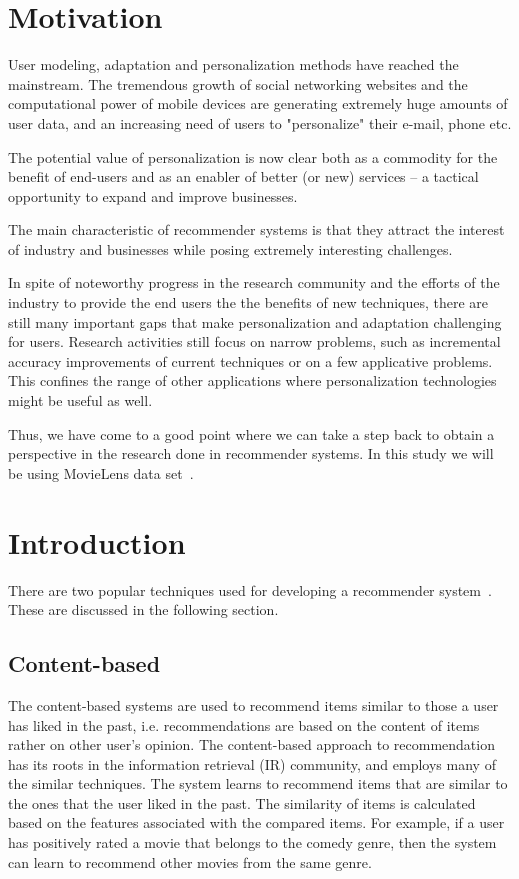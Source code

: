 \section{Motivation}

 User modeling, adaptation and personalization methods have reached the mainstream. The tremendous growth of social networking websites and the computational power of mobile devices are generating extremely huge amounts of user data, and an increasing need of users to "personalize" their e-mail, phone etc.

 The potential value of personalization is now clear both as a commodity for the benefit of end-users and as an enabler of better (or new) services – a tactical opportunity to expand and improve businesses.

 The main characteristic of recommender systems is that they attract the interest of industry and businesses while posing extremely interesting challenges.

 In spite of noteworthy progress in the research community and the efforts of the industry to provide the end users the the benefits of new techniques, there are still many important gaps that make personalization and adaptation challenging for users. Research activities still focus on narrow problems, such as incremental accuracy improvements of current techniques or on a few applicative problems. This confines the range of other applications where personalization technologies might be useful as well.

 Thus, we have come to a good point where we can take a step back to obtain a perspective in the research done in recommender systems. In this study we will be using MovieLens data set~\cite{movielens}.

\section{Introduction}
\label{sec:approaches}
There are two popular techniques used for developing a recommender system~\cite{nbrsurvey}. These are discussed in the following section.
\subsection{Content-based}
 The content-based systems are used to recommend items similar to those a user has liked in the past, i.e. recommendations are based on the content of items rather on other user's opinion. The content-based approach to recommendation has its roots in the information retrieval (IR) community, and employs many of the similar techniques. The system learns to recommend items that are similar to the ones that the user liked in the past. The similarity of items is calculated based on the features associated with the compared items. For example, if a user has positively rated a movie that belongs to the comedy genre, then the system can learn to recommend other movies from the same genre.
